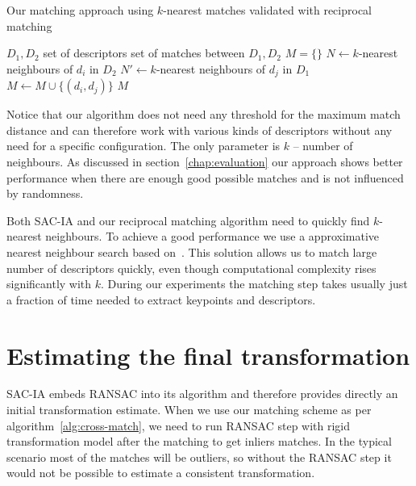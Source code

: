\begin{algorithm}
    \caption[Reciprocal $k$-nearest matching]{Our matching approach using $k$-nearest matches validated with reciprocal matching}
    \label{alg:cross-match}
    \begin{algorithmic}[1]
        \Require $D_1, D_2$ set of descriptors
        \Ensure set of matches between $D_1, D_2$
            \State $M = \{\}$
                \State $N \gets k$-nearest neighbours of $d_i$ in $D_2$
                    \State $N' \gets k$-nearest neighbours of $d_j$ in $D_1$
                        \State $M \gets M \cup \{(d_i, d_j)\}$
                    \EndIf
                \EndFor
            \EndFor
            \State \Return $M$
        \EndFunction
    \end{algorithmic}
\end{algorithm}

Notice that our algorithm does not need any threshold for the maximum match distance and can therefore work with various kinds of descriptors without any need for a specific configuration. The only parameter is $k$ -- number of neighbours. As discussed in section~\ref{chap:evaluation} our approach shows better performance when there are enough good possible matches and is not influenced by randomness.

Both \gls{SAC-IA} and our reciprocal matching algorithm need to quickly find $k$-nearest neighbours. To achieve a good performance we use a approximative nearest neighbour search based on~\cite{muja2014flann}. This solution allows us to match large number of descriptors quickly, even though computational complexity rises significantly with $k$. During our experiments the matching step takes usually just a fraction of time needed to extract keypoints and descriptors.

\section{Estimating the final transformation}

\gls{SAC-IA} embeds \gls{RANSAC} into its algorithm and therefore provides directly an initial transformation estimate. When we use our matching scheme as per algorithm~\ref{alg:cross-match}, we need to run \gls{RANSAC} step with rigid transformation model after the matching to get inliers matches. In the typical scenario most of the matches will be outliers, so without the \gls{RANSAC} step it would not be possible to estimate a consistent transformation.

